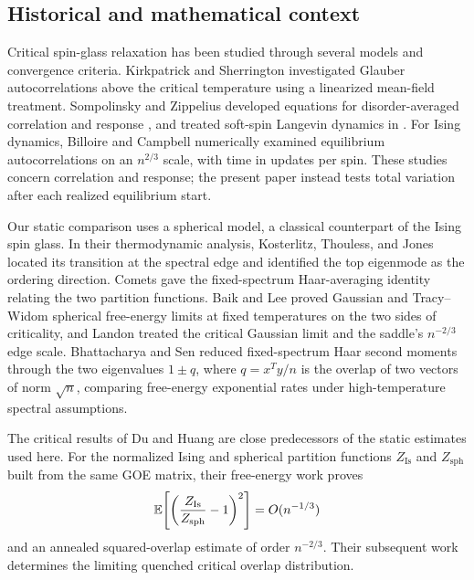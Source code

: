 \subsection{Historical and mathematical context}
Critical spin-glass relaxation has been studied through several models
and convergence criteria. Kirkpatrick and Sherrington
\cite{kirkpatrickSherrington1978} investigated Glauber autocorrelations
above the critical temperature using a linearized mean-field treatment.
Sompolinsky and Zippelius developed equations for disorder-averaged
correlation and response \cite{sompolinskyZippelius1981}, and treated
soft-spin Langevin dynamics in \cite{sompolinskyZippelius1982}. For Ising dynamics,
Billoire and Campbell \cite{billoireCampbell2011} numerically examined
equilibrium autocorrelations on an $n^{2/3}$ scale, with time in updates
per spin. These studies concern correlation and response; the present
paper instead tests total variation after each realized equilibrium start.

Our static comparison uses a spherical model, a classical counterpart of
the Ising spin glass. In their thermodynamic analysis, Kosterlitz,
Thouless, and Jones \cite{kosterlitzThoulessJones1976} located its transition
at the spectral edge and identified the top eigenmode as the ordering
direction. Comets
\cite[Equations~(2.1)--(2.2)]{comets1996} gave the fixed-spectrum
Haar-averaging identity relating the two partition functions. Baik and Lee
\cite{baikLee2016} proved Gaussian and Tracy--Widom spherical free-energy
limits at fixed temperatures on the two sides of criticality, and Landon
\cite{landon2022} treated the critical Gaussian limit and the saddle's
$n^{-2/3}$ edge scale. Bhattacharya and Sen \cite{bhattacharyaSen2016}
reduced fixed-spectrum Haar second moments through the two eigenvalues
$1\pm q$, where $q=x^Ty/n$ is the overlap of two vectors of norm $\sqrt n$,
comparing free-energy exponential rates under
high-temperature spectral assumptions.

The critical results of Du and Huang are close predecessors of the static
estimates used here. For the normalized Ising and spherical partition
functions $Z_{\mathrm{Is}}$ and $Z_{\mathrm{sph}}$ built from the same GOE
matrix, their free-energy work
\cite[Theorems~1.4 and~1.6]{duHuang2026FreeEnergy} proves
\[
 \mathbb E\!\left[\left(\frac{Z_{\mathrm{Is}}}{Z_{\mathrm{sph}}}-1\right)^2\right]
 =O(n^{-1/3})
\]
and an annealed squared-overlap estimate of order $n^{-2/3}$.
Their subsequent work \cite[Theorem~1.1]{duHuang2026Overlap}
determines the limiting quenched critical overlap distribution.

